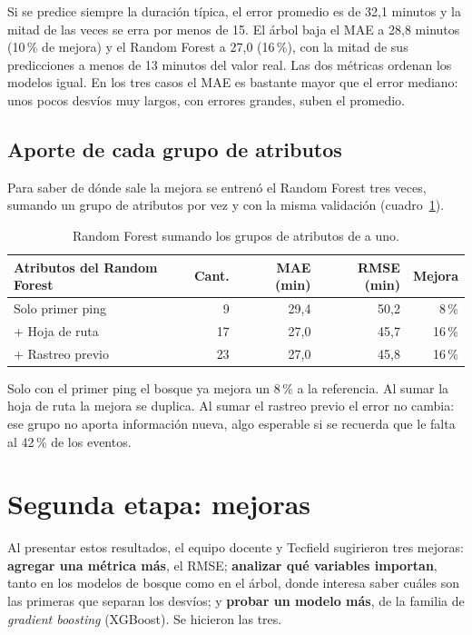 \documentclass[11pt,a4paper]{article}
\begin{document}
Si se predice siempre la duración típica, el error promedio es de 32,1 minutos y la mitad de las veces se
erra por menos de 15. El árbol baja el MAE a 28,8 minutos (10\,\% de mejora) y el Random Forest a
27,0 (16\,\%), con la mitad de sus predicciones a menos de 13 minutos del valor real. Las dos métricas
ordenan los modelos igual. En los tres casos el MAE es bastante mayor que el error mediano: unos pocos
desvíos muy largos, con errores grandes, suben el promedio.

\subsection{Aporte de cada grupo de atributos}

Para saber de dónde sale la mejora se entrenó el Random Forest tres veces, sumando un grupo de atributos
por vez y con la misma validación (cuadro~\ref{tab:grupos}).

\begin{table}[H]
  \centering
  \begin{tabular}{@{}lrrrr@{}}
    \toprule
    \textbf{Atributos del Random Forest} & \textbf{Cant.} & \textbf{MAE (min)} & \textbf{RMSE (min)} & \textbf{Mejora} \\
    \midrule
    Solo primer ping & 9 & 29,4 & 50,2 & 8\,\% \\
    + Hoja de ruta & 17 & 27,0 & 45,7 & 16\,\% \\
    + Rastreo previo & 23 & 27,0 & 45,8 & 16\,\% \\
    \bottomrule
  \end{tabular}
  \caption{Random Forest sumando los grupos de atributos de a uno.}
  \label{tab:grupos}
\end{table}

Solo con el primer ping el bosque ya mejora un 8\,\% a la referencia. Al sumar la hoja de ruta la mejora se
duplica. Al sumar el rastreo previo el error no cambia: ese grupo no aporta información nueva, algo
esperable si se recuerda que le falta al 42\,\% de los eventos.

\section{Segunda etapa: mejoras}

Al presentar estos resultados, el equipo docente y Tecfield sugirieron tres mejoras: \textbf{agregar una
métrica más}, el RMSE; \textbf{analizar qué variables importan}, tanto en los modelos de bosque como en el
árbol, donde interesa saber cuáles son las primeras que separan los desvíos; y \textbf{probar un modelo
más}, de la familia de \emph{gradient boosting} (XGBoost). Se hicieron las tres.
\end{document}
